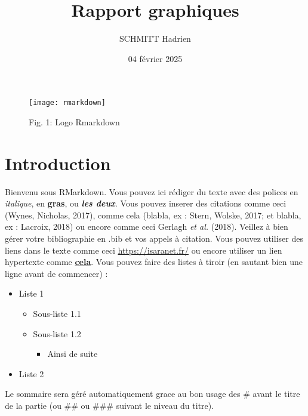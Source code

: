\documentclass[
]{article}
\title{Rapport graphiques}
\author{SCHMITT Hadrien}
\date{04 février 2025}
\providecommand{\tightlist}{%
  \setlength{\itemsep}{0pt}\setlength{\parskip}{0pt}}
\begin{document}
\maketitle

{
\setcounter{tocdepth}{3}
\tableofcontents
}
\begin{figure}

{\centering \texttt{[image: rmarkdown]} 

}

\caption{Fig. 1: Logo  Rmarkdown}\label{fig:logo}
\end{figure}

\section{Introduction}\label{introduction}

Bienvenu sous RMarkdown. Vous pouvez ici rédiger du texte avec des
polices en \emph{italique}, en \textbf{gras}, ou \textbf{\emph{les
deux}}. Vous pouvez inserer des citations comme ceci (Wynes, Nicholas,
2017), comme cela (blabla, ex : Stern, Wolske, 2017; et blabla, ex :
Lacroix, 2018) ou encore comme ceci Gerlagh \emph{et al.} (2018).
Veillez à bien gérer votre bibliographie en .bib et vos appels à
citation. Vous pouvez utiliser des liens dans le texte comme ceci
\url{https://isaranet.fr/} ou encore utiliser un lien hypertexte comme
\href{https://isaranet.fr/}{\textbf{cela}}. Vous pouvez faire des listes
à tiroir (en sautant bien une ligne avant de commencer) :

\begin{itemize}
\tightlist
\item
  Liste 1

  \begin{itemize}
  \tightlist
  \item
    Sous-liste 1.1
  \item
    Sous-liste 1.2

    \begin{itemize}
    \tightlist
    \item
      Ainsi de suite
    \end{itemize}
  \end{itemize}
\item
  Liste 2
\end{itemize}

Le sommaire sera géré automatiquement grace au bon usage des \# avant le
titre de la partie (ou \#\# ou \#\#\# suivant le niveau du titre).
\end{document}
